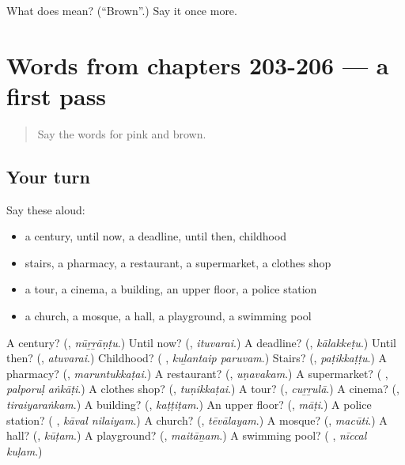 \begin{tcolorbox}[breakable,colback=teal!4,colframe=teal!35!black,title={Before you move on}]
What does  mean? (\textquotedblleft{}Brown\textquotedblright{}.) Say it once more.
\end{tcolorbox}
\section[(dialogue)]{Words from chapters 203-206 — a first pass}

\label{lesson:TA-R211-first-pass-words-from-chapters-203-206}



\begin{quote}
Say the words for pink and brown.
\end{quote}

\subsection*{Your turn}
Say these aloud:

\begin{itemize}
\raggedright
  \item a century, until now, a deadline, until then, childhood
  \item stairs, a pharmacy, a restaurant, a supermarket, a clothes shop
  \item a tour, a cinema, a building, an upper floor, a police station
  \item a church, a mosque, a hall, a playground, a swimming pool
\end{itemize}

\begin{tcolorbox}[breakable,colback=teal!4,colframe=teal!35!black,title={Before you move on}]
A century? (\textbf{}, \emph{nūṟṟāṇṭu}.) Until now? (\textbf{}, \emph{ituvarai}.) A deadline? (\textbf{}, \emph{kālakkeṭu}.) Until then? (\textbf{}, \emph{atuvarai}.) Childhood? (\textbf{ }, \emph{kuḻantaip paruvam}.) Stairs? (\textbf{}, \emph{paṭikkaṭṭu}.) A pharmacy? (\textbf{}, \emph{maruntukkaṭai}.) A restaurant? (\textbf{}, \emph{uṇavakam}.) A supermarket? (\textbf{ }, \emph{palporuḷ aṅkāṭi}.) A clothes shop? (\textbf{}, \emph{tuṇikkaṭai}.) A tour? (\textbf{}, \emph{cuṟṟulā}.) A cinema? (\textbf{}, \emph{tiraiyaraṅkam}.) A building? (\textbf{}, \emph{kaṭṭiṭam}.) An upper floor? (\textbf{}, \emph{māṭi}.) A police station? (\textbf{ }, \emph{kāval nilaiyam}.) A church? (\textbf{}, \emph{tēvālayam}.) A mosque? (\textbf{}, \emph{macūti}.) A hall? (\textbf{}, \emph{kūṭam}.) A playground? (\textbf{}, \emph{maitāṉam}.) A swimming pool? (\textbf{ }, \emph{nīccal kuḷam}.)
\end{tcolorbox}
